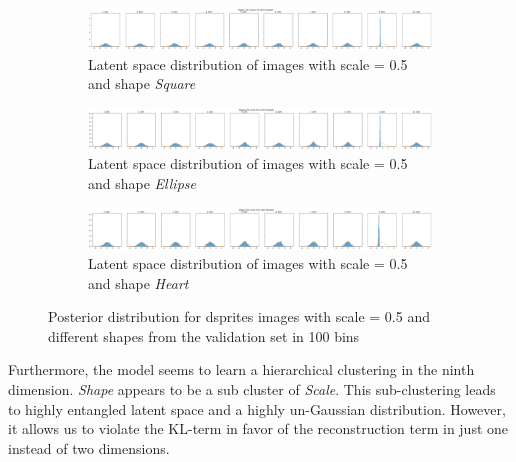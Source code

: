 \begin{figure}
    \centering
    \begin{subfigure}{\textwidth}
        \centering
        \includegraphics[width=\textwidth]{images/latent_space_entanglement/vae_dsprites_lf_10000_dist_shape_1_scale_0_5.png}
        \caption{Latent space distribution of images with scale = 0.5 and shape \textit{Square}}
    \end{subfigure}
    \begin{subfigure}{\textwidth}
        \centering
        \includegraphics[width=\textwidth]{images/latent_space_entanglement/vae_dsprites_lf_10000_dist_shape_2_scale_0_5.png}
        \caption{Latent space distribution of images with scale = 0.5 and shape \textit{Ellipse}}
    \end{subfigure}
    \begin{subfigure}{\textwidth}
        \centering
        \includegraphics[width=\textwidth]{images/latent_space_entanglement/vae_dsprites_lf_10000_dist_shape_3_scale_0_5.png}
        \caption{Latent space distribution of images with scale = 0.5 and shape \textit{Heart}}
    \end{subfigure}
    \caption[VAE Latent Space Distribution - dsprites Scale and Shapes]{Posterior distribution for dsprites images with scale = 0.5 and different shapes from the validation set in 100 bins}
    \label{fig:10000_vae_latent_space_distribution_scales_and_shapes}
\end{figure}

Furthermore, the model seems to learn a hierarchical clustering in the ninth dimension.
\textit{Shape} appears to be a sub cluster of \textit{Scale}.
This sub-clustering leads to highly entangled latent space and a highly un-Gaussian distribution.
However, it allows us to violate the \ac{KL}-term in favor of the reconstruction term in just one instead of two dimensions.


